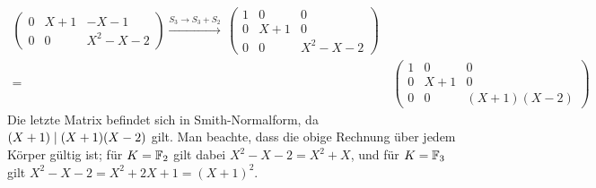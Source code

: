 \begin{align*}
\begin{pmatrix}
      0 &  X+1  &     -X-1  \\
      0 &    0  &  X^2-X-2
    \end{pmatrix}
  \xrightarrow{S_3 \to S_3 + S_2}\,
    \begin{pmatrix}
      1 &    0  &        0  \\
      0 &  X+1  &        0  \\
      0 &    0  &  X^2-X-2
    \end{pmatrix}
  \\
  =&\,
    \begin{pmatrix}
      1 &    0  &              0  \\
      0 &  X+1  &              0  \\
      0 &    0  &  (X + 1)(X - 2)
    \end{pmatrix}
\end{align*}
Die letzte Matrix befindet sich in Smith-Normalform, da $(X + 1) \mathrel{|} (X + 1)(X - 2)$ gilt.
Man beachte, dass die obige Rechnung über jedem Körper gültig ist;
für $K = \mathbb{F}_2$ gilt dabei $X^2 - X - 2 = X^2 + X$, und für $K = \mathbb{F}_3$ gilt $X^2 - X - 2 = X^2 + 2X + 1 = (X+1)^2$.

